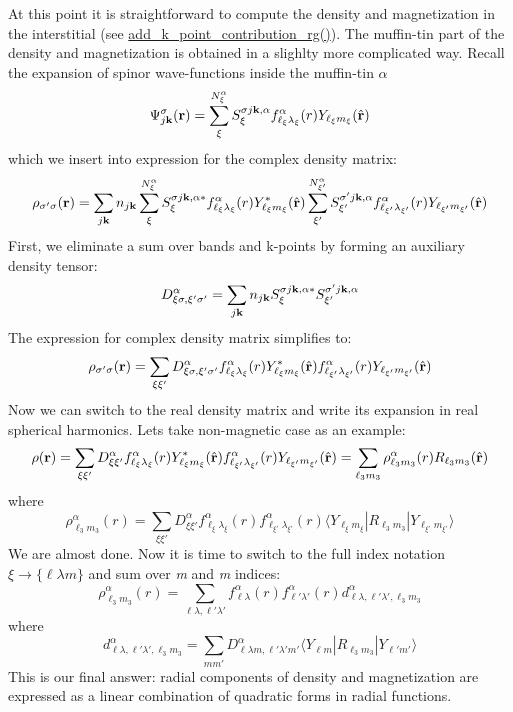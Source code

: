 At this point it is straightforward to compute the density and magnetization in the interstitial (see \hyperlink{classsirius_1_1_density_a7494a6071dc9a5ace4d812abb3eedfdd}{add\+\_\+k\+\_\+point\+\_\+contribution\+\_\+rg()}). The muffin-\/tin part of the density and magnetization is obtained in a slighlty more complicated way. Recall the expansion of spinor wave-\/functions inside the muffin-\/tin $ \alpha $ \[ \Psi_{j{\bf k}}^{\sigma}({\bf r}) = \sum_{\xi}^{N_{\xi}^{\alpha}} {S_{\xi}^{\sigma j {\bf k},\alpha}} f_{\ell_{\xi} \lambda_{\xi}}^{\alpha}(r)Y_{\ell_{\xi}m_{\xi}}(\hat {\bf r}) \] which we insert into expression for the complex density matrix\+: \[ \rho_{\sigma' \sigma}({\bf r}) = \sum_{j{\bf k}} n_{j{\bf k}} \sum_{\xi}^{N_{\xi}^{\alpha}} S_{\xi}^{\sigma j {\bf k},\alpha*} f_{\ell_{\xi} \lambda_{\xi}}^{\alpha}(r) Y_{\ell_{\xi}m_{\xi}}^{*}(\hat {\bf r}) \sum_{\xi'}^{N_{\xi'}^{\alpha}} S_{\xi'}^{\sigma' j{\bf k},\alpha} f_{\ell_{\xi'} \lambda_{\xi'}}^{\alpha}(r)Y_{\ell_{\xi'}m_{\xi'}}(\hat {\bf r}) \] First, we eliminate a sum over bands and k-\/points by forming an auxiliary density tensor\+: \[ D_{\xi \sigma, \xi' \sigma'}^{\alpha} = \sum_{j{\bf k}} n_{j{\bf k}} S_{\xi}^{\sigma j {\bf k},\alpha*} S_{\xi'}^{\sigma' j {\bf k},\alpha} \] The expression for complex density matrix simplifies to\+: \[ \rho_{\sigma' \sigma}({\bf r}) = \sum_{\xi \xi'} D_{\xi \sigma, \xi' \sigma'}^{\alpha} f_{\ell_{\xi} \lambda_{\xi}}^{\alpha}(r)Y_{\ell_{\xi}m_{\xi}}^{*}(\hat {\bf r}) f_{\ell_{\xi'} \lambda_{\xi'}}^{\alpha}(r)Y_{\ell_{\xi'}m_{\xi'}}(\hat {\bf r}) \] Now we can switch to the real density matrix and write its\textquotesingle{} expansion in real spherical harmonics. Let\textquotesingle{}s take non-\/magnetic case as an example\+: \[ \rho({\bf r}) = \sum_{\xi \xi'} D_{\xi \xi'}^{\alpha} f_{\ell_{\xi} \lambda_{\xi}}^{\alpha}(r)Y_{\ell_{\xi}m_{\xi}}^{*}(\hat {\bf r}) f_{\ell_{\xi'} \lambda_{\xi'}}^{\alpha}(r)Y_{\ell_{\xi'}m_{\xi'}}(\hat {\bf r}) = \sum_{\ell_3 m_3} \rho_{\ell_3 m_3}^{\alpha}(r) R_{\ell_3 m_3}(\hat {\bf r}) \] where \[ \rho_{\ell_3 m_3}^{\alpha}(r) = \sum_{\xi \xi'} D_{\xi \xi'}^{\alpha} f_{\ell_{\xi} \lambda_{\xi}}^{\alpha}(r) f_{\ell_{\xi'} \lambda_{\xi'}}^{\alpha}(r) \langle Y_{\ell_{\xi}m_{\xi}} | R_{\ell_3 m_3} | Y_{\ell_{\xi'}m_{\xi'}} \rangle \] We are almost done. Now it is time to switch to the full index notation $ \xi \rightarrow \{ \ell \lambda m \} $ and sum over {\itshape m} and {\itshape m\textquotesingle{}} indices\+: \[ \rho_{\ell_3 m_3}^{\alpha}(r) = \sum_{\ell \lambda, \ell' \lambda'} f_{\ell \lambda}^{\alpha}(r) f_{\ell' \lambda'}^{\alpha}(r) d_{\ell \lambda, \ell' \lambda', \ell_3 m_3}^{\alpha} \] where \[ d_{\ell \lambda, \ell' \lambda', \ell_3 m_3}^{\alpha} = \sum_{mm'} D_{\ell \lambda m, \ell' \lambda' m'}^{\alpha} \langle Y_{\ell m} | R_{\ell_3 m_3} | Y_{\ell' m'} \rangle \] This is our final answer\+: radial components of density and magnetization are expressed as a linear combination of quadratic forms in radial functions.

